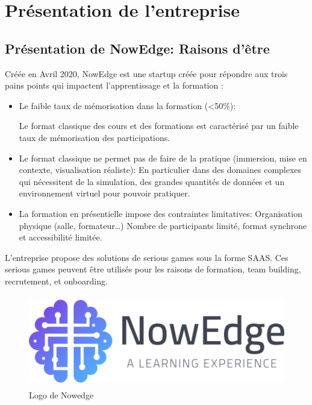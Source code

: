 \chapter{Présentation de l'entreprise}

\section{Présentation de NowEdge: Raisons d'être}

Créée en Avril 2020, NowEdge est une startup créée pour répondre aux trois pains points
qui impactent l’apprentissage et la formation :
\begin{itemize}

\item Le faible taux de mémorisation dans la formation (<50\%):

Le format classique des cours et des formations est caractérisé par un faible taux de
mémorisation des participations.

\item Le format classique ne permet pas de faire de la pratique (immersion, mise en contexte, visualisation réaliste):
En particulier dans des domaines
complexes qui nécessitent de la simulation, des grandes quantités de données et un
environnement virtuel pour pouvoir pratiquer.

\item La formation en présentielle impose des contraintes limitatives:
Organisation physique (salle, formateur…) Nombre de participants limité, format
synchrone et accessibilité limitée.

\end{itemize}

L’entreprise propose des solutions de serious games sous la forme SAAS. Ces serious games
peuvent être utilisés pour les raisons de formation, team building, recrutement, et onboarding.\\

\begin{figure}[!h]
\begin{center}
\includegraphics[height=4cm]{Images/nowedge.png}
\end{center}
\caption{Logo de Nowedge}
\end{figure}


